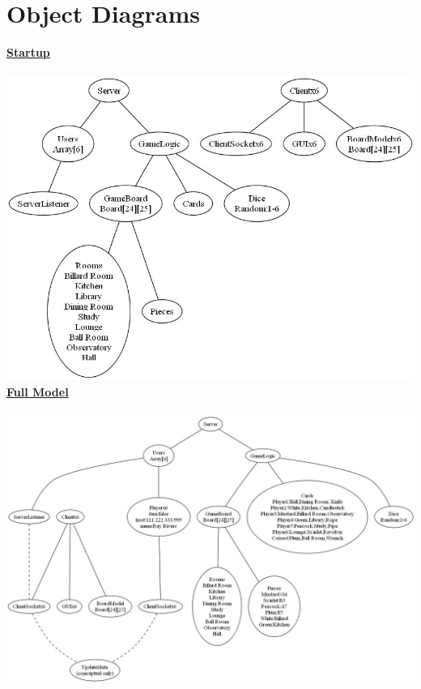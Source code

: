 \part{Object Diagrams}%
%
%
\begin{flushleft}%
	{\Large \underline{\textbf{Startup}}} \\~\\%
	\includegraphics[width=6.5in, angle=90]{../DesignDocumentation/07_ObjectDiagrams/modelShortLoad_REV02.jpg}	%
	\newpage%
	{\Large \underline{\textbf{Full Model}}} \\~\\%
	\includegraphics[width=7.5in,angle=90]{../DesignDocumentation/07_ObjectDiagrams/modelShort_REV02.jpg}%

\end{flushleft}
